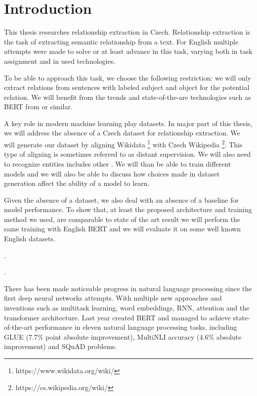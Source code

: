 \chapter*{Introduction}

This thesis researches relationship extraction in Czech. Relationship extraction is the task of extracting semantic relationship from a text. For English multiple attempts were made to solve or at least advance in this task, varying both in task assignment and in used technologies. 

To be able to approach this task, we choose the following restriction: we will only extract relations from sentences with labeled subject and object for the potential relation. We will benefit from the trends and state-of-the-are technologies such as BERT from \cite{devlin2018bert} or similar.  

A key role in modern machine learning play datasets. In major part of this thesis, we will address the absence of a Czech dataset for relationship extraction. We will generate our dataset by aligning Wikidata \footnote{https://www.wikidata.org/wiki/} with Czech Wikipedia  \footnote{https://cs.wikipedia.org/wiki/}. This type of aligning is sometimes referred to as distant supervision. We will also need to recognize entities includes other . We will than be able to train different models and we will also be able to discuss how choices made in dataset generation affect the ability of a model to learn.

Given the absence of a dataset, we also deal with an absence of a baseline for model performance. To show that, at least the proposed architecture and training method we used, are comparable to state of the art result we will perform the same training with English BERT and we will evaluate it on some well known English datasets. 

.

.



There has been made noticeable progress in natural language processing since the first deep neural networks attempts. With multiple new approaches and  inventions such as multitask learning, word embeddings, RNN, attention and the transformer architecture.   Last year \cite{devlin2018bert} created BERT and managed to achieve state-of-the-art performance in eleven natural language processing tasks, including GLUE (7.7\% point absolute improvement), MultiNLI accuracy (4.6\% absolute improvement) and SQuAD problems.


